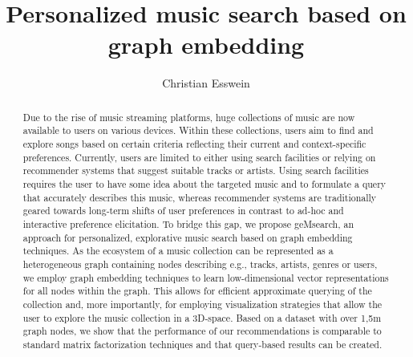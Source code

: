 \documentclass[sigconf]{acmart}
\begin{document}
\title{Personalized music search based on graph embedding}


\author{Christian Esswein}



\begin{abstract}
	
	Due to the rise of music streaming platforms, huge collections of music are now available to users on various devices. Within these collections, users aim to find and explore songs based on certain criteria reflecting their current and context-specific preferences. Currently, users are limited to either using search facilities or relying on recommender systems that suggest suitable tracks or artists. Using search facilities requires the user to have some idea about the targeted music and to formulate a query that accurately describes this music, whereas recommender systems are traditionally geared towards long-term shifts of user preferences in contrast to ad-hoc and interactive preference elicitation. To bridge this gap, we propose geMsearch, an approach for personalized, explorative music search based on graph embedding techniques. As the ecosystem of a music collection can be represented as a heterogeneous graph containing nodes describing e.g., tracks, artists, genres or users, we employ graph embedding techniques to learn low-dimensional vector representations for all nodes within the graph. This allows for efficient approximate querying of the collection and, more importantly, for employing visualization strategies that allow the user to explore the music collection in a 3D-space. Based on a dataset with over 1,5m graph nodes, we show that the performance of our recommendations is comparable to standard matrix factorization techniques and that query-based results can be created.
	
\end{abstract}
\end{document}
